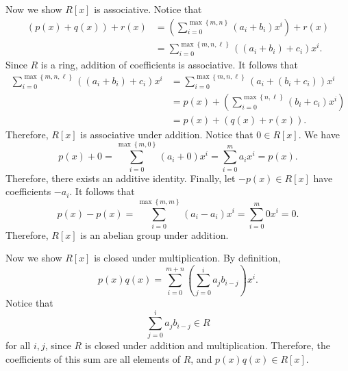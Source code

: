 \documentclass[11pt, letterpaper]{report}
\begin{document}
Now we show $R[x]$ is associative. Notice that
\begin{align*}
	\left( p(x)+q(x) \right) +r(x)&=\left(\sum_{i=0}^{\max \left\{ m,n \right\} } \left( a_i+b_i \right) x^i\right)+r(x)\\
				      &=\sum_{i=0}^{\max \left\{ m,n,\ell  \right\}}\left( \left( a_i+b_i \right) +c_i\right)x^i
.\end{align*}
Since $R$ is a ring, addition of coefficients is associative. It follows that
\begin{align*}
	\sum_{i=0}^{\max \left\{ m,n,\ell  \right\}}\left( \left( a_i+b_i \right) +c_i\right)x^i&=\sum_{i=0}^{\max \left\{ m,n,\ell  \right\}} \left( a_i+\left( b_i+c_i \right)  \right) x^i\\
												&=p(x)+\left( \sum_{i=0}^{\max \left\{ n,\ell  \right\} } \left( b_i+c_i \right) x^i \right) \\
												&=p(x)+\left( q(x)+r(x) \right) 
.\end{align*}
Therefore, $R[x]$ is associative under addition. Notice that $0\in R[x]$. We have
\[
	p(x)+0=\sum_{i=0}^{\max \left\{ m,0 \right\} } \left( a_i+0 \right) x^i=\sum_{i=0}^{m} a_ix^i=p(x)
.\]
Therefore, there exists an additive identity. Finally, let $-p(x)\in R[x]$ have coefficients $-a_i$. It follows that
\[
	p(x)-p(x)=\sum_{i=0}^{\max \left\{ m,m \right\} } \left( a_i-a_i \right) x^i=\sum_{i=0}^{m} 0x^i=0
.\]
Therefore, $R[x]$ is an abelian group under addition.

Now we show $R[x]$ is closed under multiplication. By definition,
\[
	p(x)q(x)=\sum_{i=0}^{m+n} \left(\sum_{j=0}^{i} a_jb_{i-j}\right)x^i
.\]
Notice that
\[
	\sum_{j=0}^{i} a_jb_{i-j}\in R
\]
for all $i,j$, since $R$ is closed under addition and multiplication. Therefore, the coefficients of this sum are all elements of $R$, and $p(x)q(x)\in R[x]$.
\end{document}
